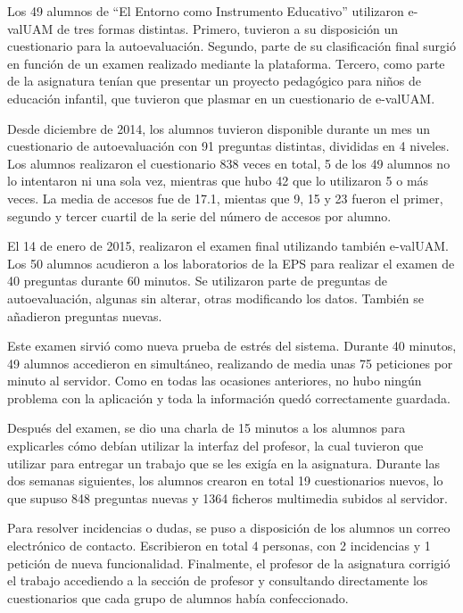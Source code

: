 Los 49 alumnos de ``El Entorno como Instrumento Educativo'' utilizaron e-valUAM de tres formas distintas. Primero, tuvieron a su disposición un cuestionario para la autoevaluación. Segundo, parte de su clasificación final surgió en función de un examen realizado mediante la plataforma. Tercero, como parte de la asignatura tenían que presentar un proyecto pedagógico para niños de educación infantil, que tuvieron que plasmar en un cuestionario de e-valUAM. 

Desde diciembre de 2014, los alumnos tuvieron disponible durante un mes un cuestionario de autoevaluación con 91 preguntas distintas, divididas en 4 niveles. Los alumnos realizaron el cuestionario 838 veces en total, 5 de los 49 alumnos no lo intentaron ni una sola vez, mientras que hubo 42 que lo utilizaron 5 o más veces. La media de accesos fue de 17.1, mientas que 9, 15 y 23 fueron el primer, segundo y tercer cuartil de la serie del número de accesos por alumno.

El 14 de enero de 2015, realizaron el examen final utilizando también e-valUAM. Los 50 alumnos acudieron a los laboratorios de la EPS para realizar el examen de 40 preguntas durante 60 minutos. Se utilizaron parte de preguntas de autoevaluación, algunas sin alterar, otras modificando los datos. También se añadieron preguntas nuevas.

Este examen sirvió como nueva prueba de estrés del sistema. Durante 40 minutos, 49 alumnos accedieron en simultáneo, realizando de media unas 75 peticiones por minuto al servidor. Como en todas las ocasiones anteriores, no hubo ningún problema con la aplicación y toda la información quedó correctamente guardada.

Después del examen, se dio una charla de 15 minutos a los alumnos para explicarles cómo debían utilizar la interfaz del profesor, la cual tuvieron que utilizar para entregar un trabajo que se les exigía en la asignatura. Durante las dos semanas siguientes, los alumnos crearon en total 19 cuestionarios nuevos, lo que supuso 848 preguntas nuevas y 1364 ficheros multimedia subidos al servidor. 

Para resolver incidencias o dudas, se puso a disposición de los alumnos un correo electrónico de contacto. Escribieron en total 4 personas, con 2 incidencias y 1 petición de nueva funcionalidad. Finalmente, el profesor de la asignatura corrigió el trabajo accediendo a la sección de profesor y consultando directamente los cuestionarios que cada grupo de alumnos había confeccionado.

